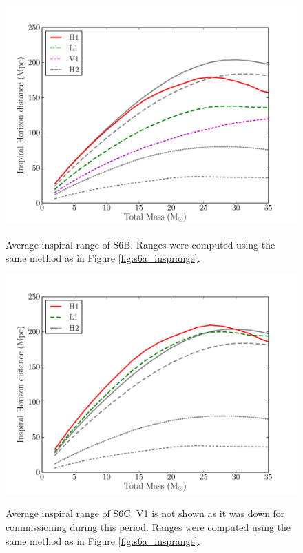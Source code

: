 \begin{figure}[p]
\begin{center}
\label{fig:s6b_insprange}
\includegraphics[width=6in]{figures/s6b_insprange.pdf}
\end{center}
\caption{Average inspiral range of S6B. Ranges were computed using the same method as in Figure \ref{fig:s6a_insprange}.}
\end{figure}

\begin{figure}[p]
\begin{center}
\label{fig:s6c_insprange}
\includegraphics[width=6in]{figures/s6c_insprange.pdf}
\end{center}
\caption{Average inspiral range of S6C. V1 is not shown as it was down for commissioning during this period. Ranges were computed using the same method as in Figure \ref{fig:s6a_insprange}.}
\end{figure}

